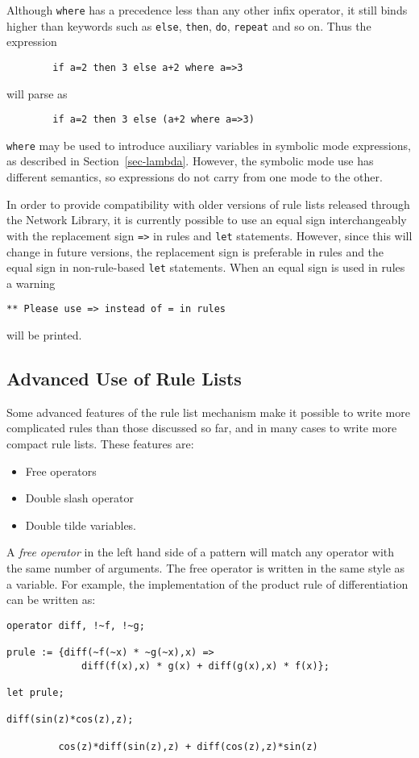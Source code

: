 Although \texttt{where} has a precedence less than any other infix operator,
it still binds higher than keywords such as \texttt{else}, \texttt{then},
\texttt{do}, \texttt{repeat} and so on.  Thus the expression
\begin{verbatim}
        if a=2 then 3 else a+2 where a=>3
\end{verbatim}
will parse as
\begin{verbatim}
        if a=2 then 3 else (a+2 where a=>3)
\end{verbatim}
\texttt{where} may be used to introduce auxiliary variables in symbolic mode
expressions, as described in Section~\ref{sec-lambda}.  However, the
symbolic mode use has different semantics, so expressions do not carry
from one mode to the other.

\COMPATNOTE In order to provide compatibility with older versions of rule
lists released through the Network Library, it is currently possible to use
an equal sign interchangeably with the replacement sign \texttt{=>} in rules
and \texttt{let} statements.  However, since this will change in future
versions, the replacement sign is preferable in rules and the equal sign
in non-rule-based \texttt{let} statements.
When an equal sign is used in rules a warning
\begin{verbatim}
** Please use => instead of = in rules
\end{verbatim}
will be printed.

\subsection*{Advanced Use of Rule Lists}

Some advanced features of the rule list mechanism make it possible to
write more complicated rules than those discussed so far, and in many
cases to write more compact rule lists.  These features are:

\begin{itemize}
\item Free operators
\item Double slash operator
\item Double tilde variables.
\end{itemize}
A \emph{free operator} in the left hand side of a pattern will match any
operator with the same number of arguments.  The free operator is written
in the same style as a variable.  For example, the implementation of the
product rule of differentiation can be written as:
\begin{verbatim}
operator diff, !~f, !~g;

prule := {diff(~f(~x) * ~g(~x),x) =>
             diff(f(x),x) * g(x) + diff(g(x),x) * f(x)};

let prule;

diff(sin(z)*cos(z),z);

         cos(z)*diff(sin(z),z) + diff(cos(z),z)*sin(z)
\end{verbatim}

